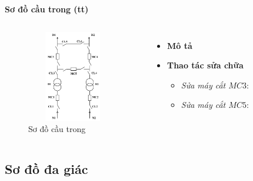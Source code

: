 \documentclass{beamer}
\begin{document}
\begin{frame}{\textbf{Sơ đồ cầu trong  (tt)}}
\begin{columns}
\begin{figure}[h]
\includegraphics[width=4cm, height=4cm]{sdct}
\caption{Sơ đồ cầu trong}
\end{figure}

\begin{itemize}
\item \textbf{Mô tả}
\item  \textbf{Thao tác sửa chữa}
\begin{itemize}
\item<1-> \emph{Sửa máy cắt $MC3$}: 
\item<1-> \emph{Sửa máy cắt $MC5$}: 
\end{itemize}
\end{itemize}
\end{columns}
\end{frame}

\subsection{Sơ đồ đa giác}
\end{document}

